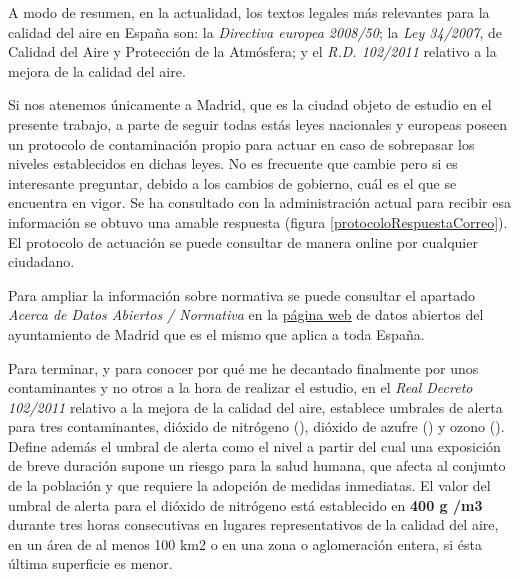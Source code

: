 A modo de resumen, en la actualidad, los textos legales más relevantes para la calidad del aire en España son: la \textit{Directiva europea 2008/50}; la \textit{Ley 34/2007}, de Calidad del Aire y Protección de la Atmósfera; y el \textit{R.D. 102/2011 }relativo a la mejora de la calidad del aire.

Si nos atenemos únicamente a Madrid, que es la ciudad objeto de estudio en el presente trabajo, a parte de seguir todas estás leyes nacionales y europeas poseen un protocolo de contaminación propio para actuar en caso de sobrepasar los niveles establecidos en dichas leyes. No es frecuente que cambie pero si es interesante preguntar, debido a los cambios de gobierno, cuál es el que se encuentra en vigor. Se ha consultado con la administración actual para recibir esa información se obtuvo una amable respuesta (figura \ref{protocoloRespuestaCorreo}). El protocolo de actuación se puede consultar de manera online \cite{ley_protocolo_madrid} por cualquier ciudadano.


Para ampliar la información sobre normativa se puede consultar el apartado \textit{Acerca de Datos Abiertos / Normativa} en la \href{https://datos.madrid.es/portal/site/egob/menuitem.400a817358ce98c34e937436a8a409a0/?vgnextoid=830512b9ace9f310VgnVCM100000171f5a0aRCRD&vgnextchannel=830512b9ace9f310VgnVCM100000171f5a0aRCRD&vgnextfmt=default}{página web} de datos abiertos del ayuntamiento de Madrid que es el mismo que aplica a toda España.

Para terminar, y para conocer por qué me he decantado finalmente por unos contaminantes y no otros a la hora de realizar el estudio, en el \textit{Real Decreto 102/2011} relativo a la mejora de la calidad del aire, establece umbrales de alerta para tres contaminantes,  dióxido de nitrógeno (), dióxido de azufre () y ozono (). Define además el umbral de alerta como el nivel a partir del cual una exposición de breve duración supone un riesgo para la salud humana, que afecta al conjunto de la población y que requiere la adopción de medidas inmediatas. El valor del umbral de alerta para el dióxido de nitrógeno está establecido en \textbf{400 \textmugreek g /m3} durante tres horas consecutivas en lugares representativos de la calidad del aire, en un área de al menos 100 km2 o en una zona o aglomeración entera, si ésta última superficie es menor.

